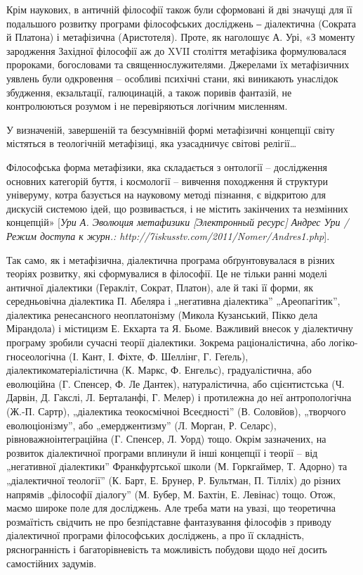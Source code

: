 Крім наукових, в античній філософії також були сформовані й дві значущі
для її подальшого розвитку програми філософських досліджень ‒ діалектична
(Сократа й Платона) і метафізична (Аристотеля). Проте, як наголошує А. Урі,
«З моменту зародження Західної філософії аж до XVII століття метафізика
формулювалася пророками, богословами та священнослужителями. Джерелами
їх метафізичних уявлень були одкровення – особливі психічні стани, які
виникають унаслідок збудження, екзальтації, галюцинацій, а також поривів
фантазій, не контролюються розумом і не перевіряються логічним мисленням.

У визначеній, завершеній та безсумнівній формі метафізичні концепції світу
містяться в теологічній метафізиці, яка узасадничує світові релігії…

Філософська форма метафізики, яка складається з онтології – дослідження
основних категорій буття, і космології – вивчення походження й структури
універуму, котра базується на науковому методі пізнання, є відкритою для
дискусій системою ідей, що розвивається, і не містить закінчених та незмінних
концепцій» [\textit{Ури А. Эволюция метафизики [Электронный ресурс] Андрес Ури /
Режим доступа к журн.: http://7\-is\-kuss\-tv.com/2011/Nomer/Andres\-1.php}].

Так само, як і метафізична, діалектична програма обґрунтовувалася в різних
теоріях розвитку, які сформувалися в філософії. Це не тільки ранні моделі
античної діалектики (Геракліт, Сократ, Платон), але й такі її форми, як
середньовічна діалектика П. Абеляра і „негативна діалектика” „Ареопагітик”,
діалектика ренесансного неоплатонізму (Микола Кузанський, Пікко дела
Мірандола) і містицизм Е. Екхарта та Я. Бьоме. Важливий внесок у діалектичну
програму зробили сучасні теорії діалектики. Зокрема раціоналістична, або
логіко-гносеологічна (І. Кант, І. Фіхте, Ф. Шеллінг, Г. Геґель), діалектикоматеріалістична (К. Маркс, Ф. Енгельс), градуалістична, або еволюційна (Г.
Спенсер, Ф. Ле Дантек), натуралістична, або сцієнтистська (Ч. Дарвін, Д.
Гакслі, Л. Берталанфі, Г. Мелер) і протилежна до неї антропологічна (Ж.-П.
Сартр), „діалектика теокосмічноі Всеєдності” (В. Соловйов), „творчого
еволюціонізму”, або „емерджентизму” (Л. Морган, Р. Селарс), рівноважноінтеграційна (Г. Спенсер, Л. Уорд) тощо. Окрім зазначених, на розвиток
діалектичної програми вплинули й інші концепції і теорії – від „негативної
діалектики” Франкфуртської школи (М. Горкгаймер, Т. Адорно) та
„діалектичної теології” (К. Барт, Е. Брунер, Р. Бультман, П. Тілліх) до різних
напрямів „філософії діалогу” (М. Бубер, М. Бахтін, Е. Левінас) тощо. Отож,
маємо широке поле для досліджень. Але треба мати на увазі, що теоретична
розмаїтість свідчить не про безпідставне фантазування філософів з приводу
діалектичної програми філософських досліджень, а про її складність,
рясногранність і багаторівневість та можливість побудови щодо неї досить
самостійних задумів.

